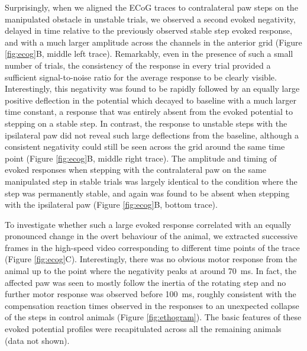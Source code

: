 Surprisingly, when we aligned the ECoG traces to contralateral paw steps on the manipulated obstacle in unstable trials, we observed a second evoked negativity, delayed in time relative to the previously observed stable step evoked response, and with a much larger amplitude across the channels in the anterior grid (Figure \ref{fig:ecog}B, middle left trace). Remarkably, even in the presence of such a small number of trials, the consistency of the response in every trial provided a sufficient signal-to-noise ratio for the average response to be clearly visible. Interestingly, this negativity was found to be rapidly followed by an equally large positive deflection in the potential which decayed to baseline with a much larger time constant, a response that was entirely absent from the evoked potential to stepping on a stable step. In contrast, the response to unstable steps with the ipsilateral paw did not reveal such large deflections from the baseline, although a consistent negativity could still be seen across the grid around the same time point (Figure \ref{fig:ecog}B, middle right trace). The amplitude and timing of evoked responses when stepping with the contralateral paw on the same manipulated step in stable trials was largely identical to the condition where the step was permanently stable, and again was found to be absent when stepping with the ipsilateral paw (Figure \ref{fig:ecog}B, bottom trace).

To investigate whether such a large evoked response correlated with an equally pronounced change in the overt behaviour of the animal, we extracted successive frames in the high-speed video corresponding to different time points of the trace (Figure \ref{fig:ecog}C). Interestingly, there was no obvious motor response from the animal up to the point where the negativity peaks at around \SI{70}{\milli\second}. In fact, the affected paw was seen to mostly follow the inertia of the rotating step and no further motor response was observed before \SI{100}{\milli\second}, roughly consistent with the compensation reaction times observed in the responses to an unexpected collapse of the steps in control animals (Figure \ref{fig:ethogram}). The basic features of these evoked potential profiles were recapitulated across all the remaining animals (data not shown).
